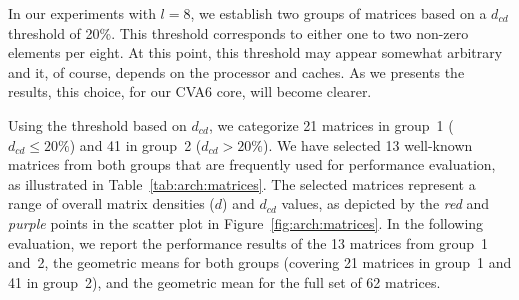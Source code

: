 In our experiments with $l = 8$, we establish two groups of matrices based on a $d_\mathit{cd}$ threshold of 20\%.
This threshold corresponds to either one to two non-zero elements per eight.
At this point, this threshold may appear somewhat arbitrary and it, of course, depends on the processor and caches.
As we presents the results, this choice, for our CVA6 core, will become clearer.

Using the threshold based on $d_\mathit{cd}$, we categorize 21 matrices in group~1 ($d_\mathit{cd} \leqslant 20\%$) and 41 in group~2 ($d_\mathit{cd} > 20\%$).
We have selected 13 well-known matrices from both groups that are frequently used for performance evaluation, as illustrated in Table~\ref{tab:arch:matrices}.
The selected matrices represent a range of overall matrix densities ($d$) and $d_\mathit{cd}$ values, as depicted by the \textit{red} and \textit{purple} points in the scatter plot in Figure~\ref{fig:arch:matrices}.
In the following evaluation, we report the performance results of the 13 matrices from group~1 and~2, the geometric means for both groups (covering 21 matrices in group~1 and 41 in group~2), and the geometric mean for the full set of 62 matrices.

